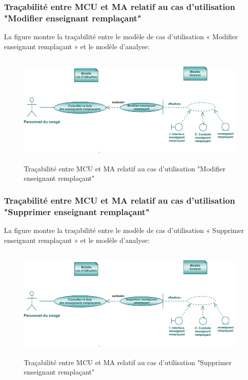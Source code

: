 \documentclass[12 pt]{report}
\begin{document}
\subsubsection{Traçabilité entre MCU et MA relatif au  cas d’utilisation "Modifier enseignant remplaçant" }
La figure  montre la traçabilité entre le modèle de  cas d’utilisation « Modifier enseignant remplaçant » et le modèle d’analyse:
\begin{figure}[h]
\begin{center}
\includegraphics[width= 12cm , height =5.5cm]{mod_rem.PNG}
\caption{Traçabilité entre MCU et MA relatif au  cas d’utilisation "Modifier enseignant remplaçant"}
\end{center}
\end{figure}
\subsubsection{Traçabilité entre MCU et MA relatif au  cas d’utilisation "Supprimer enseignant remplaçant" }
La figure  montre la traçabilité entre le modèle de  cas d’utilisation « Supprimer enseignant remplaçant » et le modèle d’analyse:
\begin{figure}[h]
\begin{center}
\includegraphics[width= 12cm , height =5.5cm]{sup_rem.PNG}
\caption{Traçabilité entre MCU et MA relatif au  cas d’utilisation "Supprimer enseignant remplaçant"}
\end{center}
\end{figure}
\end{document}
